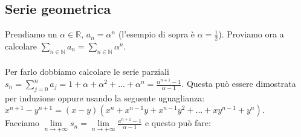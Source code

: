 \subsection{Serie geometrica}
Prendiamo un $\alpha \in \mathbb{R}$, $a_n = \alpha^n$ (l'esempio di sopra è $\alpha = \frac{1}{2}$). Proviamo ora a calcolare $\sum\limits_{n\in \mathbb{N}}a_n = \sum\limits_{n\in \mathbb{N}}\alpha^n$.\\\\
Per farlo dobbiamo calcolare le serie parziali $s_n = \sum\limits_{j=0}^n a_j = 1 + \alpha + \alpha^2 + ... + \alpha^n = \frac{\alpha^{n+1} - 1}{\alpha -1}$. Questa può essere dimostrata per induzione oppure usando la seguente uguaglianza: $x^{n+1} - y^{n+1} = (x - y)(x^n + x^{n-1}y + x^{n-1}y^2 + ... + xy^{n-1} + y^n)$.\\
Facciamo $\lim\limits_{n\to +\infty}s_n = \lim\limits_{n\to +\infty}\frac{a^{n+1}-1}{\alpha - 1}$ e questo può fare:
